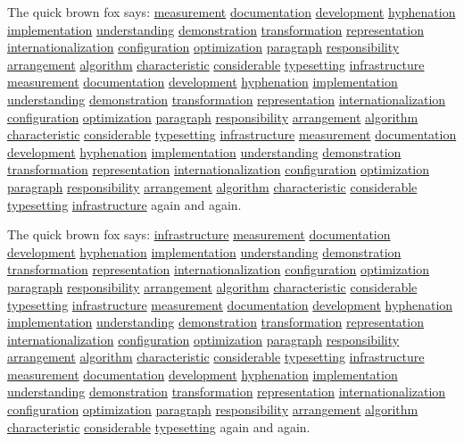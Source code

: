 \documentclass{article}
\begin{document}
The quick brown fox says: \underline{measurement} \underline{documentation} \underline{development} \underline{hyphenation} \underline{implementation} \underline{understanding} \underline{demonstration} \underline{transformation} \underline{representation} \underline{internationalization} \underline{configuration} \underline{optimization} \underline{paragraph} \underline{responsibility} \underline{arrangement} \underline{algorithm} \underline{characteristic} \underline{considerable} \underline{typesetting} \underline{infrastructure} \underline{measurement} \underline{documentation} \underline{development} \underline{hyphenation} \underline{implementation} \underline{understanding} \underline{demonstration} \underline{transformation} \underline{representation} \underline{internationalization} \underline{configuration} \underline{optimization} \underline{paragraph} \underline{responsibility} \underline{arrangement} \underline{algorithm} \underline{characteristic} \underline{considerable} \underline{typesetting} \underline{infrastructure} \underline{measurement} \underline{documentation} \underline{development} \underline{hyphenation} \underline{implementation} \underline{understanding} \underline{demonstration} \underline{transformation} \underline{representation} \underline{internationalization} \underline{configuration} \underline{optimization} \underline{paragraph} \underline{responsibility} \underline{arrangement} \underline{algorithm} \underline{characteristic} \underline{considerable} \underline{typesetting} \underline{infrastructure} again and again.

The quick brown fox says: \underline{infrastructure} \underline{measurement} \underline{documentation} \underline{development} \underline{hyphenation} \underline{implementation} \underline{understanding} \underline{demonstration} \underline{transformation} \underline{representation} \underline{internationalization} \underline{configuration} \underline{optimization} \underline{paragraph} \underline{responsibility} \underline{arrangement} \underline{algorithm} \underline{characteristic} \underline{considerable} \underline{typesetting} \underline{infrastructure} \underline{measurement} \underline{documentation} \underline{development} \underline{hyphenation} \underline{implementation} \underline{understanding} \underline{demonstration} \underline{transformation} \underline{representation} \underline{internationalization} \underline{configuration} \underline{optimization} \underline{paragraph} \underline{responsibility} \underline{arrangement} \underline{algorithm} \underline{characteristic} \underline{considerable} \underline{typesetting} \underline{infrastructure} \underline{measurement} \underline{documentation} \underline{development} \underline{hyphenation} \underline{implementation} \underline{understanding} \underline{demonstration} \underline{transformation} \underline{representation} \underline{internationalization} \underline{configuration} \underline{optimization} \underline{paragraph} \underline{responsibility} \underline{arrangement} \underline{algorithm} \underline{characteristic} \underline{considerable} \underline{typesetting} again and again.
\end{document}
